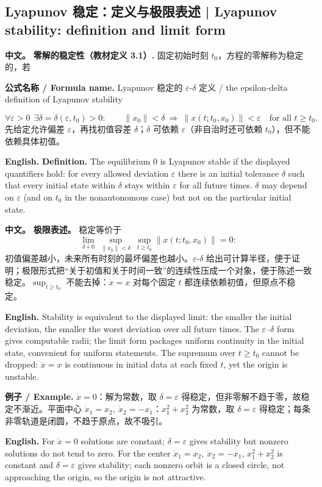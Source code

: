 \documentclass[UTF8,11pt,a4paper]{ctexart}
\newcommand{\EN}[1]{\par\noindent\textbf{English.} #1\par}
\newcommand{\FORMULA}[2]{\par\noindent\textbf{公式名称 / Formula name.} #1 / #2\par}
\newcommand{\EX}[2]{\par\noindent\textbf{例子 / Example.} #1\par\EN{#2}}
\newcommand{\APS}[2]{\par\noindent\textbf{中文。} #1\par\noindent\textbf{English.} #2\par}
\newcommand{\norm}[1]{\lVert #1\rVert}\newcommand{\abs}[1]{\lvert #1\rvert}
\begin{document}
\subsection{Lyapunov 稳定：定义与极限表述 | Lyapunov stability: definition and limit form}
\APS{\textbf{零解的稳定性（教材定义 3.1）.} 固定初始时刻 $t_0$，方程的零解称为稳定的，若
\FORMULA{Lyapunov 稳定的 $\varepsilon$-$\delta$ 定义}{the epsilon-delta definition of Lyapunov stability}
\[
\forall\varepsilon>0\ \ \exists\delta=\delta(\varepsilon,t_0)>0:\qquad
\norm{x_0}<\delta\ \Longrightarrow\ \norm{x(t;t_0,x_0)}<\varepsilon\quad\text{for all }t\ge t_0 .
\]
先给定允许偏差 $\varepsilon$，再找初值容差 $\delta$；$\delta$ 可依赖 $\varepsilon$（非自治时还可依赖 $t_0$），但不能依赖具体初值。}{\textbf{Definition.} The equilibrium $0$ is Lyapunov stable if the displayed quantifiers hold: for every allowed deviation $\varepsilon$ there is an initial tolerance $\delta$ such that every initial state within $\delta$ stays within $\varepsilon$ for all future times. $\delta$ may depend on $\varepsilon$ (and on $t_0$ in the nonautonomous case) but not on the particular initial state.}

\APS{\textbf{极限表述。} 稳定等价于
\[
\lim_{\delta\downarrow0}\ \sup_{\norm{x_0}<\delta}\ \sup_{t\ge t_0}\norm{x(t;t_0,x_0)}=0 :
\]
初值偏差越小，未来所有时刻的最坏偏差也越小。$\varepsilon$-$\delta$ 给出可计算半径，便于证明；极限形式把“关于初值和关于时间一致”的连续性压成一个对象，便于陈述一致稳定。$\sup_{t\ge t_0}$ 不能去掉：$\dot x=x$ 对每个固定 $t$ 都连续依赖初值，但原点不稳定。}{Stability is equivalent to the displayed limit: the smaller the initial deviation, the smaller the worst deviation over all future times. The $\varepsilon$--$\delta$ form gives computable radii; the limit form packages uniform continuity in the initial state, convenient for uniform statements. The supremum over $t\ge t_0$ cannot be dropped: $\dot x=x$ is continuous in initial data at each fixed $t$, yet the origin is unstable.}

\EX{$\dot x=0$：解为常数，取 $\delta=\varepsilon$ 得稳定，但非零解不趋于零，故稳定不渐近。平面中心 $\dot x_1=x_2,\ \dot x_2=-x_1$：$x_1^2+x_2^2$ 为常数，取 $\delta=\varepsilon$ 得稳定；每条非零轨道是闭圆，不趋于原点，故不吸引。}{For $\dot x=0$ solutions are constant; $\delta=\varepsilon$ gives stability but nonzero solutions do not tend to zero. For the center $\dot x_1=x_2,\ \dot x_2=-x_1$, $x_1^2+x_2^2$ is constant and $\delta=\varepsilon$ gives stability; each nonzero orbit is a closed circle, not approaching the origin, so the origin is not attractive.}
\end{document}
